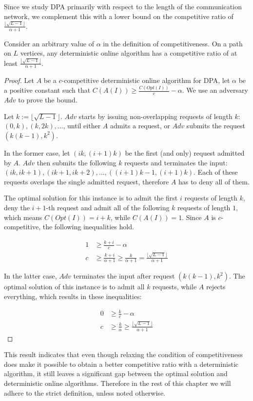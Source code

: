Since we study DPA primarily with respect to the length of the
communication network, we complement this with a lower bound on the
competitive ratio of $\frac{\lfloor\sqrt{L-1}\rfloor}{\alpha+1}$.

\begin{theorem}\label{theorem:relaxed-dpa-deterministic}
    Consider an arbitrary value of $\alpha$ in the definition of
    competitiveness. On a path on $L$ vertices, any deterministic online
    algorithm has a competitive ratio of at least
    $\frac{\lfloor\sqrt{L-1}\rfloor}{\alpha+1}$.
\end{theorem}

\begin{proof}
    Let $A$ be a $c$-competitive deterministic online algorithm for DPA,
    let $\alpha$ be a positive constant such that $C(A(I)) \geq
    \frac{C(Opt(I))}{c} - \alpha$. We use an adversary $Adv$ to prove the
    bound.

    Let $k := \lfloor\sqrt{L-1}\rfloor$. $Adv$ starts by issuing
    non-overlapping requests of length $k$: $(0, k), (k, 2k), \dots$,
    until either $A$ admits a request, or $Adv$ submits the request
    $(k(k-1), k^2)$.

    In the former case, let $(ik, (i+1)k)$ be the first (and only) request
    admitted by $A$. $Adv$ then submits the following $k$ requests and
    terminates the input: $(ik, ik+1), (ik+1, ik+2), \dots, ((i+1)k-1,
    (i+1)k)$. Each of these requests overlaps the single admitted request,
    therefore $A$ has to deny all of them.

    The optimal solution for this instance is to admit the first $i$
    requests of length $k$, deny the $i+1$-th request and admit all of the
    following $k$ requests of length $1$, which means $C(Opt(I)) = i+k$,
    while $C(A(I)) = 1$. Since $A$ is $c$-competitive, the following
    inequalities hold.

    \begin{align*}
        1 &\geq \frac{k+i}{c} - \alpha \\
        c &\geq \frac{k+i}{\alpha + 1} \geq \frac{k}{\alpha + 1} =
        \frac{\lfloor\sqrt{L-1}\rfloor}{\alpha + 1}
    \end{align*}

    In the latter case, $Adv$ terminates the input after request $(k(k-1),
    k^2)$. The optimal solution of this instance is to admit all $k$
    requests, while $A$ rejects everything, which results in these
    inequalities:

    \begin{align*}
        0 &\geq \frac{k}{c} - \alpha \\
        c &\geq \frac{k}{\alpha} \geq \frac{\lfloor\sqrt{L-1}\rfloor}{\alpha + 1}
    \end{align*}
\end{proof}

This result indicates that even though relaxing the condition of
competitiveness does make it possible to obtain a better competitive ratio
with a deterministic algorithm, it still leaves a significant gap between
the optimal solution and deterministic online algorithms. Therefore in the
rest of this chapter we will adhere to the strict definition, unless noted
otherwise.
